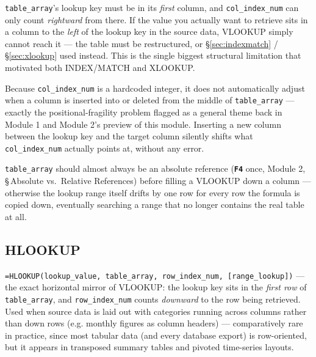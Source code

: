 \documentclass[11pt,a4paper]{article}
\newcommand{\key}[1]{\texttt{\colorbox{black!8}{\textbf{#1}}}}
\begin{document}
\begin{pitfall}
\texttt{table\_array}'s lookup key must be in its \emph{first} column, and \texttt{col\_index\_num} can only count \emph{rightward} from there. If the value you actually want to retrieve sits in a column to the \emph{left} of the lookup key in the source data, VLOOKUP simply cannot reach it --- the table must be restructured, or \S\ref{sec:indexmatch} / \S\ref{sec:xlookup} used instead. This is the single biggest structural limitation that motivated both INDEX/MATCH and XLOOKUP.
\end{pitfall}

\begin{pitfall}
Because \texttt{col\_index\_num} is a hardcoded integer, it does not automatically adjust when a column is inserted into or deleted from the middle of \texttt{table\_array} --- exactly the positional-fragility problem flagged as a general theme back in Module 1 and Module 2's preview of this module. Inserting a new column between the lookup key and the target column silently shifts what \texttt{col\_index\_num} actually points at, without any error.
\end{pitfall}

\begin{protip}
\texttt{table\_array} should almost always be an absolute reference (\key{F4} once, Module 2, \S\,Absolute vs.\ Relative References) before filling a VLOOKUP down a column --- otherwise the lookup range itself drifts by one row for every row the formula is copied down, eventually searching a range that no longer contains the real table at all.
\end{protip}

\subsection{HLOOKUP}

\begin{formulasyntax}[HLOOKUP]
\texttt{=HLOOKUP(lookup\_value, table\_array, row\_index\_num, [range\_lookup])} --- the exact horizontal mirror of VLOOKUP: the lookup key sits in the \emph{first row} of \texttt{table\_array}, and \texttt{row\_index\_num} counts \emph{downward} to the row being retrieved. Used when source data is laid out with categories running across columns rather than down rows (e.g. monthly figures as column headers) --- comparatively rare in practice, since most tabular data (and every database export) is row-oriented, but it appears in transposed summary tables and pivoted time-series layouts.
\end{formulasyntax}
\end{document}
